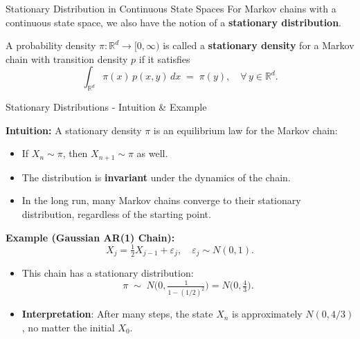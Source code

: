 \documentclass[8pt]{beamer}
\begin{document}
\begin{frame}{Stationary Distribution in Continuous State Spaces}
For Markov chains with a continuous state space, we also have the notion of a 
\textbf{stationary distribution}.

\vspace{3mm}

A probability density $\pi: \mathbb{R}^d \to [0,\infty)$ is called a 
\textbf{stationary density} for a Markov chain with transition density $p$ if it satisfies
\[
\int_{\mathbb{R}^d} \pi(x)\,p(x,y)\,dx \;=\; \pi(y),
\quad \forall \, y \in \mathbb{R}^d.
\]

\end{frame}

\begin{frame}{Stationary Distributions - Intuition \& Example}

\textbf{Intuition:}  
A stationary density $\pi$ is an \alert{equilibrium law} for the Markov chain:
\begin{itemize}
    \item If $X_n \sim \pi$, then $X_{n+1} \sim \pi$ as well.
    \item The distribution is \textbf{invariant} under the dynamics of the chain.
    \item In the long run, many Markov chains converge to their stationary distribution,
    regardless of the starting point.
\end{itemize}

\vspace{3mm}

\textbf{Example (Gaussian AR(1) Chain):}  
\[
X_j = \tfrac{1}{2} X_{j-1} + \varepsilon_j, 
\quad \varepsilon_j \sim N(0,1).
\]

\begin{itemize}
    \item This chain has a stationary distribution:
    \[
    \pi \;\sim\; N\!\Big(0, \tfrac{1}{1-(1/2)^2}\Big) 
    = N\!\Big(0,\tfrac{4}{3}\Big).
    \]
    \item \textbf{Interpretation}: After many steps, the state $X_n$ is approximately $N(0,4/3)$,
    no matter the initial $X_0$.
\end{itemize}

\end{frame}
\end{document}
